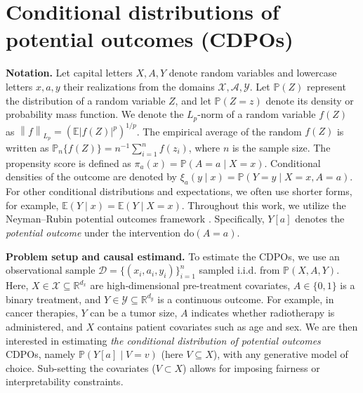 \documentclass[dvipsnames]{article} %
\newcommand{\abs}[1]{\left\lvert #1 \right\rvert}
\newcommand{\norm}[1]{\left\lVert#1\right\rVert}
\newcommand{\CDPOs}{CDPOs\xspace}
\begin{document}
\section{Conditional distributions of potential outcomes (CDPOs)} \label{sec:cdpos}


\textbf{Notation.} Let capital letters $X, A, Y$ denote random variables and lowercase letters $x, a, y$ their realizations from the domains $\mathcal{X}, \mathcal{A}, \mathcal{Y}$. Let $\mathbb{P}(Z)$ represent the distribution of a random variable $Z$, and let $\mathbb{P}(Z = z)$ denote its density or probability mass function. We denote the $L_p$-norm of a random variable $f(Z)$ as $\norm{f}_{L_p} = (\mathbb{E}\abs{f(Z)}^p)^{1/p}$. The empirical average of the random $f(Z)$ is written as $\mathbb{P}_n\{{f(Z)}\} = n^{-1}\sum_{i=1}^n f(z_i)$, where $n$ is the sample size. The propensity score is defined as $\pi_a(x) = \mathbb{P}(A = a \mid X = x)$. Conditional densities of the outcome are denoted by $\xi_a(y \mid x) = \mathbb{P}(Y = y \mid X = x, A = a)$. For other conditional distributions and expectations, we often use shorter forms, for example, $\mathbb{E}(Y \mid x) = \mathbb{E}(Y \mid X = x)$. Throughout this work, we utilize the Neyman–Rubin potential outcomes framework \citep{rubin1974estimating}. Specifically, $Y[a]$ denotes the \emph{potential outcome} under the intervention $\mathrm{do}(A = a)$.

\textbf{Problem setup and causal estimand.} To estimate the \CDPOs, we use an observational sample $\mathcal{D}=\{(x_i, a_i, y_i)\}_{i=1}^n$ sampled i.i.d. from $\mathbb{P}(X, A, Y)$. Here, $X \in \mathcal{X}\subseteq\mathbb{R}^{d_x}$ are high‑dimensional pre-treatment covariates, $A\in\{0,1\}$ is a binary treatment, and $Y \in \mathcal{Y}\subseteq\mathbb{R}^{d_y}$ is a continuous outcome. For example, in cancer therapies, $Y$ can be a tumor size, $A$ indicates whether radiotherapy is administered, and $X$ contains patient covariates such as age and sex. We are then interested in estimating \emph{the conditional distribution of potential outcomes} \CDPOs, namely $\mathbb{P}(Y[a] \mid V = v)$ (here $V \subseteq X$), with any generative model of choice. Sub-setting the covariates ($V \subset X$) allows for imposing fairness or interpretability constraints.
\end{document}
